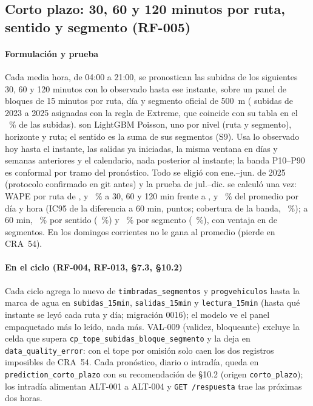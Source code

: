 \documentclass[10pt,a4paper]{article}
\begin{document}
\subsection{Corto plazo: 30, 60 y 120 minutos por ruta, sentido y segmento (RF-005)}
\label{sec:corto}
\paragraph{Formulación y prueba} Cada media hora, de 04:00 a 21:00, se pronostican las subidas de los siguientes 30, 60
y 120 minutos con lo observado hasta ese instante, sobre un panel de bloques de 15 minutos por ruta, día y segmento
oficial de 500~m (\CortoSubidas{} subidas de 2023 a 2025 asignadas con la regla de Extreme, que coincide con su tabla
en el \CortoMismoSegmento~\% de las subidas). \texttt{\CortoModelo} son \CortoArtefactos{} LightGBM Poisson, uno por
nivel (ruta y segmento), horizonte y ruta; el sentido es la suma de sus segmentos (S9). Usa lo observado hoy hasta el
instante, las salidas ya iniciadas, la misma ventana en días y semanas anteriores y el calendario, nada posterior al
instante; la banda P10--P90 es conformal por tramo del pronóstico. Todo se eligió con ene.--jun. de 2025 (protocolo
confirmado en git antes) y la prueba de jul.--dic. se calculó una vez: WAPE por ruta de \CortoRutaTreinta,
\CortoRutaSesenta{} y \CortoRutaCientoveinte~\% a 30, 60 y 120 min frente a \CortoRutaTreintaBase,
\CortoRutaSesentaBase{} y \CortoRutaCientoveinteBase~\% del promedio por día y hora (IC95 de la diferencia a 60 min,
\CortoDifIC{} puntos; cobertura de la banda, \CortoCobertura~\%); a 60 min, \CortoSentidoSesenta~\% por sentido
(\CortoSentidoSesentaBase~\%) y \CortoSegmentoSesenta~\% por segmento (\CortoSegmentoSesentaBase~\%), con ventaja en
\CortoSegGana{} de \CortoSegTotal{} segmentos. En los domingos corrientes no le gana al promedio (pierde en CRA~54).

\paragraph{En el ciclo (RF-004, RF-013, §7.3, §10.2)} Cada ciclo agrega lo nuevo de \texttt{timbradas\_segmentos} y
\texttt{progvehiculos} hasta la marca de agua en \texttt{subidas\_15min}, \texttt{salidas\_15min} y
\texttt{lectura\_15min} (hasta qué instante se leyó cada ruta y día; migración 0016); el modelo ve el panel
empaquetado más lo leído, nada más. VAL-009 (validez, bloqueante) excluye la celda que supera
\texttt{cp\_tope\_subidas\_bloque\_segmento} y la deja en \texttt{data\_quality\_error}: con el tope por omisión solo
caen los dos registros imposibles de CRA~54. Cada pronóstico, diario o intradía, queda en
\texttt{prediction\_corto\_plazo} con su recomendación de §10.2 (origen \texttt{corto\_plazo}); los intradía alimentan
ALT-001 a ALT-004 y \texttt{GET /respuesta} trae las próximas dos horas.
\end{document}
